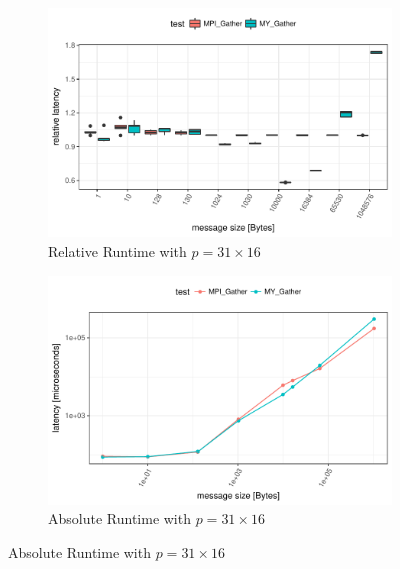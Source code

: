\begin{figure}[h]
    \centering
    
    \begin{subfigure}[b]{0.49\textwidth}
        \includegraphics[width=\textwidth]{../benchmarks/openmpi/binom/gather_31/rel_runtime.pdf}
        \caption{Relative Runtime with $p=31 \times 16$}
        \label{fig:Gather:OpenMPI:Rel:31}
    \end{subfigure}
    \begin{subfigure}[b]{0.49\textwidth}
        \includegraphics[width=\textwidth]{../benchmarks/openmpi/binom/gather_31/runtime.pdf}
        \caption{Absolute Runtime with $p=31 \times 16$}
        \label{fig:Gather:OpenMPI:Abs:31}
    \end{subfigure}
    

\end{figure}
